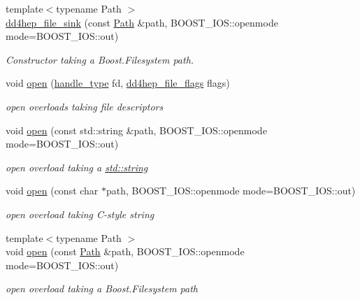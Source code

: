 \begin{DoxyCompactItemize}
{\footnotesize template$<$typename Path $>$ }\\\hyperlink{class_d_d4hep_1_1dd4hep__file__sink_a621a67e659fb867ff45ea8d711123970}{dd4hep\_\-file\_\-sink} (const \hyperlink{class_d_d4hep_1_1_path}{Path} \&path, BOOST\_\-IOS::openmode mode=BOOST\_\-IOS::out)
\begin{DoxyCompactList}\small\item\em Constructor taking a Boost.Filesystem path. \item\end{DoxyCompactList}\item 
void \hyperlink{class_d_d4hep_1_1dd4hep__file__sink_a55c1fa794f9474e51d6489496843e358}{open} (\hyperlink{class_t}{handle\_\-type} fd, \hyperlink{namespace_d_d4hep_a31d19f9b0ce567067d2897fbda1761e5}{dd4hep\_\-file\_\-flags} flags)
\begin{DoxyCompactList}\small\item\em open overloads taking file descriptors \item\end{DoxyCompactList}\item 
void \hyperlink{class_d_d4hep_1_1dd4hep__file__sink_a5b7bcc7d6d67664ffa22bd8115903a7a}{open} (const std::string \&path, BOOST\_\-IOS::openmode mode=BOOST\_\-IOS::out)
\begin{DoxyCompactList}\small\item\em open overload taking a \hyperlink{classstd_1_1string}{std::string} \item\end{DoxyCompactList}\item 
void \hyperlink{class_d_d4hep_1_1dd4hep__file__sink_aae7af8ee1e98ae89b380ddf2dc3f51f9}{open} (const char $\ast$path, BOOST\_\-IOS::openmode mode=BOOST\_\-IOS::out)
\begin{DoxyCompactList}\small\item\em open overload taking C-\/style string \item\end{DoxyCompactList}\item 
{\footnotesize template$<$typename Path $>$ }\\void \hyperlink{class_d_d4hep_1_1dd4hep__file__sink_a0bce86bdf11e60fc99a0ac32579bee36}{open} (const \hyperlink{class_d_d4hep_1_1_path}{Path} \&path, BOOST\_\-IOS::openmode mode=BOOST\_\-IOS::out)
\begin{DoxyCompactList}\small\item\em open overload taking a Boost.Filesystem path \item\end{DoxyCompactList}\end{DoxyCompactItemize}


